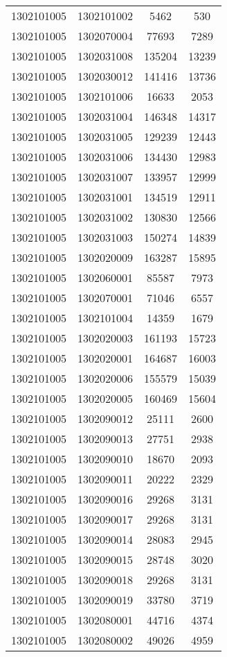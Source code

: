 \begin{longtable}{llcc}
1302101005 & 1302101002 & 5462 & 530\\
1302101005 & 1302070004 & 77693 & 7289\\
1302101005 & 1302031008 & 135204 & 13239\\
1302101005 & 1302030012 & 141416 & 13736\\
1302101005 & 1302101006 & 16633 & 2053\\
1302101005 & 1302031004 & 146348 & 14317\\
1302101005 & 1302031005 & 129239 & 12443\\
1302101005 & 1302031006 & 134430 & 12983\\
1302101005 & 1302031007 & 133957 & 12999\\
1302101005 & 1302031001 & 134519 & 12911\\
1302101005 & 1302031002 & 130830 & 12566\\
1302101005 & 1302031003 & 150274 & 14839\\
1302101005 & 1302020009 & 163287 & 15895\\
1302101005 & 1302060001 & 85587 & 7973\\
1302101005 & 1302070001 & 71046 & 6557\\
1302101005 & 1302101004 & 14359 & 1679\\
1302101005 & 1302020003 & 161193 & 15723\\
1302101005 & 1302020001 & 164687 & 16003\\
1302101005 & 1302020006 & 155579 & 15039\\
1302101005 & 1302020005 & 160469 & 15604\\
1302101005 & 1302090012 & 25111 & 2600\\
1302101005 & 1302090013 & 27751 & 2938\\
1302101005 & 1302090010 & 18670 & 2093\\
1302101005 & 1302090011 & 20222 & 2329\\
1302101005 & 1302090016 & 29268 & 3131\\
1302101005 & 1302090017 & 29268 & 3131\\
1302101005 & 1302090014 & 28083 & 2945\\
1302101005 & 1302090015 & 28748 & 3020\\
1302101005 & 1302090018 & 29268 & 3131\\
1302101005 & 1302090019 & 33780 & 3719\\
1302101005 & 1302080001 & 44716 & 4374\\
1302101005 & 1302080002 & 49026 & 4959\\

\end{longtable}
